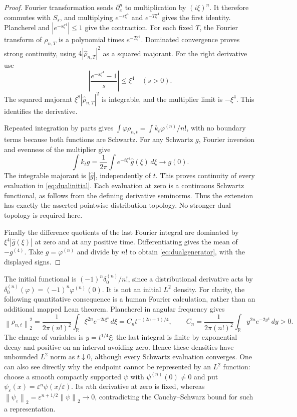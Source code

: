 \documentclass[11pt]{article}
\theoremstyle{remark}\newtheorem{remark}[theorem]{Remark}
\newcommand{\R}{\mathbb R}\newcommand{\N}{\mathbb N}
\newcommand{\norm}[1]{\left\lVert#1\right\rVert}
\begin{document}
\begin{proof}
Fourier transformation sends $\partial_x^n$ to multiplication
by $(i\xi)^n$. It therefore commutes with $S_s$, and multiplying
$e^{-s\xi^4}$ and $e^{-T\xi^4}$ gives the first identity.
Plancherel and $|e^{-s\xi^4}|\leq1$ give the contraction.
For each fixed $T$, the Fourier transform of $\rho_{n,T}$ is
a polynomial times $e^{-T\xi^4}$. Dominated convergence proves
strong continuity, using $4|\widehat\rho_{n,T}|^2$ as a squared
majorant. For the right derivative use
\[
 \left|\frac{e^{-s\xi^4}-1}{s}\right|\leq\xi^4\quad(s>0).
\]
The squared majorant $\xi^8|\widehat\rho_{n,T}|^2$ is integrable,
and the multiplier limit is $-\xi^4$. This identifies the derivative.

Repeated integration by parts gives
$\int\varphi\rho_{n,t}=\int k_t\varphi^{(n)}/n!$, with no boundary
terms because both functions are Schwartz. For any Schwartz $g$,
Fourier inversion and evenness of the multiplier give
\[
 \int k_t g=\frac1{2\pi}\int e^{-t\xi^4}\widehat g(\xi)\,d\xi
   \longrightarrow g(0).
\]
The integrable majorant is $|\widehat g|$, independently of $t$.
This proves continuity of every evaluation in
\eqref{eq:dualinitial}. Each evaluation at zero is a continuous
Schwartz functional, as follows from the defining derivative
seminorms. Thus the extension has exactly the asserted
pointwise distribution topology. No stronger dual topology
is required here.

Finally the difference quotients of the last Fourier integral
are dominated by $\xi^4|\widehat g(\xi)|$ at zero and at any
positive time. Differentiating gives the mean of $-g^{(4)}$.
Take $g=\varphi^{(n)}$ and divide by $n!$ to obtain
\eqref{eq:dualgenerator}, with the displayed signs.
\end{proof}

The initial functional is $(-1)^n\delta_0^{(n)}/n!$, since a
distributional derivative acts by $\delta_0^{(n)}(\varphi)
=(-1)^n\varphi^{(n)}(0)$. It is not an initial $L^2$ density.
For clarity, the following quantitative consequence is a human
Fourier calculation, rather than an additional mapped Lean theorem.
Plancherel in angular frequency gives
\begin{equation}\label{eq:duall2scaling}
 \norm{\rho_{n,t}}_2^2
 =\frac1{2\pi(n!)^2}\int_\R \xi^{2n}e^{-2t\xi^4}\,d\xi
 =C_n t^{-(2n+1)/4},\qquad
 C_n=\frac1{2\pi(n!)^2}\int_\R y^{2n}e^{-2y^4}\,dy>0.
\end{equation}
The change of variables is $y=t^{1/4}\xi$; the last integral is
finite by exponential decay and positive on an interval avoiding
zero. Hence these densities have unbounded $L^2$ norm as
$t\downarrow0$, although every Schwartz evaluation converges.
One can also see directly why the endpoint cannot be represented
by an $L^2$ function: choose a smooth compactly supported $\psi$
with $\psi^{(n)}(0)\ne0$ and put
$\psi_\varepsilon(x)=\varepsilon^n\psi(x/\varepsilon)$.
Its $n$th derivative at zero is fixed, whereas
$\norm{\psi_\varepsilon}_2=\varepsilon^{n+1/2}\norm\psi_2\to0$,
contradicting the Cauchy--Schwarz bound for such a representation.
\end{document}
